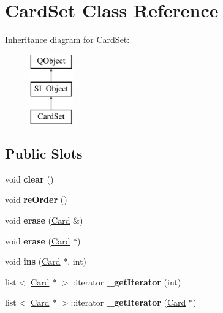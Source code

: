 \hypertarget{class_card_set}{}\section{Card\+Set Class Reference}
\label{class_card_set}
Inheritance diagram for Card\+Set\+:\begin{figure}[H]
\begin{center}
\leavevmode
\includegraphics[height=3.000000cm]{class_card_set}
\end{center}
\end{figure}
\subsection*{Public Slots}
\begin{DoxyCompactItemize}
\item 
\mbox{\label{class_card_set_aceb4ca4e4afc86a9e023d9fe8d4e4779}} 
void {\bfseries clear} ()
\item 
\mbox{\label{class_card_set_ae0800ef1090156cc46b19fec949fe91f}} 
void {\bfseries re\+Order} ()
\item 
\mbox{\label{class_card_set_a8b7912316916ea6c69f151ecfdbcddb9}} 
void {\bfseries erase} (\hyperlink{class_card}{Card} \&)
\item 
\mbox{\label{class_card_set_a8dc3d979e356f0d97ebea17a1b8fc539}} 
void {\bfseries erase} (\hyperlink{class_card}{Card} $\ast$)
\item 
\mbox{\label{class_card_set_a5e61777b1d1eb2ca933ef5c16eb0e945}} 
void {\bfseries ins} (\hyperlink{class_card}{Card} $\ast$, int)
\item 
\mbox{\label{class_card_set_ae2da9ca0de5572e3d045b61233b3c134}} 
list$<$ \hyperlink{class_card}{Card} $\ast$ $>$\+::iterator {\bfseries \+\_\+get\+Iterator} (int)
\item 
\mbox{\label{class_card_set_a8fbebc315fd5f9fd62e3f0ae081883e2}} 
list$<$ \hyperlink{class_card}{Card} $\ast$ $>$\+::iterator {\bfseries \+\_\+get\+Iterator} (\hyperlink{class_card}{Card} $\ast$)
\end{DoxyCompactItemize}

